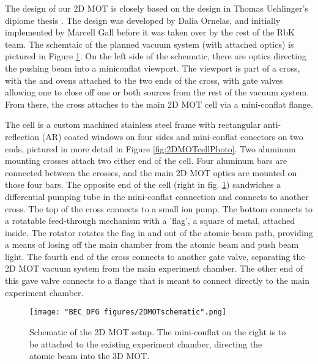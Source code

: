The design of our 2D MOT is closely based on the design in Thomas Uehlinger's diplome thesis \cite{UehlingerThesis}. The design was developed by Dalia Ornelas, and initially implemented by Marcell Gall before it was taken over by the rest of the RbK team. The schemtaic of the planned vacuum system (with attached optics) is pictured in Figure \ref{fig:2DMOTschematic}. On the left side of the schematic, there are optics directing the pushing beam into a miniconflat viewport. The viewport is part of a cross, with the \K{} and \Rb{} ovens attached to the two ends of the cross, with gate valves allowing one to close off one or both sources from the rest of the vacuum system. From there, the cross attaches to the main 2D MOT cell via a mini-conflat flange. 

The cell is a custom machined stainless steel frame with rectangular anti-reflection (AR) coated windows on four sides and mini-conflat conectors on two ends, pictured in more detail in Figure \ref{fig:2DMOTcellPhoto}. Two aluminum mounting crosses attach two either end of the cell. Four aluminum bars are connected between the crosses, and the main 2D MOT optics are mounted on those four bars. The opposite end of the cell (right in fig. \ref{fig:2DMOTschematic}) sandwiches a differential pumping tube in the mini-conflat connection and connects to another cross. The top of the cross connects to a small ion pump. The bottom connects to a rotatable feed-through mechanism with a 'flag', a square of metal, attached inside. The rotator rotates the flag in and out of the atomic beam path, providing a means of losing off the main chamber from the atomic beam and push beam light. The fourth end of the cross connects to another gate valve, separating the 2D MOT vacuum system from the main experiment chamber. The other end of this gave valve connects to a flange that is meant to connect directly to the main experiment chamber.  


\begin{figure}
	\texttt{[image: "BEC\_DFG figures/2DMOTschematic".png]}
\caption[Schematic of the 2D MOT setup]{Schematic of the 2D MOT setup. The mini-conflat on the right is to be attached to the existing experiment chamber, directing the atomic beam into the 3D MOT. }
\label{fig:2DMOTschematic}
\end{figure}

